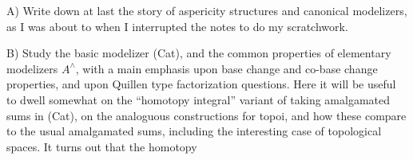 A)  Write down at last the story of aspericity structures and canonical
modelizers,  as I was about to when I interrupted the notes to do my 
scratchwork.

B)  Study the basic modelizer (Cat),  and the common properties of
elementary modelizers $A^{\wedge}$,  with a main emphasis upon base change and
co-base change properties,  and upon Quillen type factorization questions.
Here it will be useful to dwell somewhat on the ``homotopy integral'' variant
of taking amalgamated sums in (Cat),  on the analoguous constructions for
topoi,  and how these compare to the usual amalgamated sums, including the
interesting case of topological spaces.  It turns out that the homotopy

